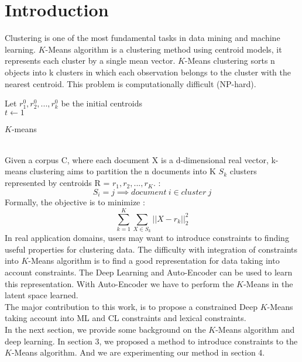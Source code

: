 \section{Introduction}\label{sec:intro}

Clustering is one of the most fundamental tasks in data mining and machine
learning. $K$-Means algorithm is a clustering method using centroid models,
it represents each cluster by a single mean vector. $K$-Means clustering sorts
n objects into k clusters in which each observation belongs to
the cluster with the nearest centroid. This problem is computationally
difficult (NP-hard).
\begin{algorithm}
  Let $r_1^{0}, r_2^{0} , ..., r_k^{0}$ be the initial centroids\\
  $t \gets 1$\\
  \caption{$K$-means}
\end{algorithm}
\\Given a corpus C, where each document X is a 
d-dimensional real vector, k-means clustering aims to partition the n 
documents into K $S_k$ clusters represented by centroids 
R = {$r_1, r_2, ..., r_K$}. :
\begin{equation*}
  S_{i} = j \implies document~ i \in cluster~ j 
\end{equation*}
Formally, the objective is to minimize :
$$
\sum_{k =1 }^K \sum_{X \in S_k} ||X - r_k||_2^2
$$
In real application domains, users may want to introduce constraints to finding 
useful properties for clustering data. The difficulty with integration of 
constraints into $K$-Means algorithm is to find a good representation for data 
taking into account constraints. The Deep Learning and Auto-Encoder can be used 
to learn this representation. With Auto-Encoder we have to perform the $K$-Means 
in the latent space learned.
\\The major contribution to this work, is to propose a constrained Deep $K$-Means 
taking account into ML and CL constraints and lexical constraints.
\\In the next section, we provide some background on the $K$-Means algorithm and 
deep learning. In section 3, we proposed a method to introduce constraints to 
the $K$-Means algorithm. And we are experimenting our method in section 4.
